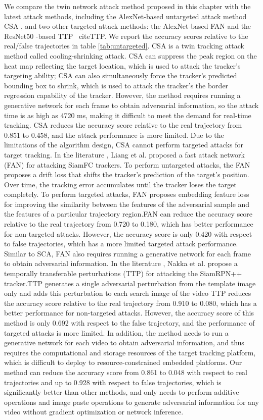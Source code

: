 \documentclass[journal]{IEEEtran}
\begin{document}
We compare the twin network attack method proposed in this chapter with the latest attack methods, including the AlexNet-based untargeted attack method CSA \cite{CSA}, and two other targeted attack methods: the AlexNet-based FAN \cite{FAN} and the ResNet50 -based TTP \ cite{TTP}. We report the accuracy scores relative to the real/false trajectories in table \ref{tab:untargeted}. CSA \cite{CSA} is a twin tracking attack method called cooling-shrinking attack. CSA can suppress the peak region on the heat map reflecting the target location, which is used to attack the tracker's targeting ability; CSA can also simultaneously force the tracker's predicted bounding box to shrink, which is used to attack the tracker's the border regression capability of the tracker. However, the method requires running a generative network for each frame to obtain adversarial information, so the attack time is as high as 4720 ms, making it difficult to meet the demand for real-time tracking. CSA reduces the accuracy score relative to the real trajectory from 0.851 to 0.458, and the attack performance is more limited. Due to the limitations of the algorithm design, CSA cannot perform targeted attacks for target tracking. In the literature \cite{FAN}, Liang et al. proposed a fast attack network (FAN) for attacking SiamFC trackers. To perform untargeted attacks, the FAN proposes a drift loss that shifts the tracker's prediction of the target's position. Over time, the tracking error accumulates until the tracker loses the target completely. To perform targeted attacks, FAN proposes embedding feature loss for improving the similarity between the features of the adversarial sample and the features of a particular trajectory region.FAN can reduce the accuracy score relative to the real trajectory from 0.720 to 0.180, which has better performance for non-targeted attacks. However, the accuracy score is only 0.420 with respect to false trajectories, which has a more limited targeted attack performance. Similar to SCA, FAN also requires running a generative network for each frame to obtain adversarial information. In the literature \cite{TTP}, Nakka et al. propose a temporally transferable perturbations (TTP) for attacking the SiamRPN++ tracker.TTP generates a single adversarial perturbation from the template image only and adds this perturbation to each search image of the video TTP reduces the accuracy score relative to the real trajectory from 0.910 to 0.080, which has a better performance for non-targeted attacks. However, the accuracy score of this method is only 0.692 with respect to the false trajectory, and the performance of targeted attacks is more limited. In addition, the method needs to run a generative network for each video to obtain adversarial information, and thus requires the computational and storage resources of the target tracking platform, which is difficult to deploy to resource-constrained embedded platforms. Our method can reduce the accuracy score from 0.861 to 0.048 with respect to real trajectories and up to 0.928 with respect to false trajectories, which is significantly better than other methods, and only needs to perform additive operations and image paste operations to generate adversarial information for any video without gradient optimization or network inference.
\end{document}
